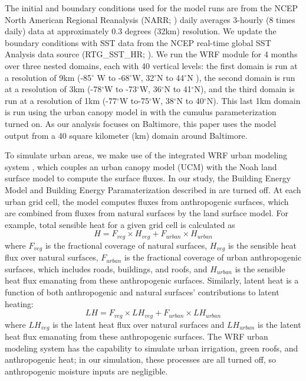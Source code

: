 \documentclass[draft,linenumbers]{agujournal}
\begin{document}
The initial and boundary conditions used for the model runs are from the NCEP North American Regional Reanalysis (NARR; \cite{mesinger2006north}) daily averages 3-hourly (8 times daily) data at approximately 0.3 degrees (32km) resolution. 
We update the boundary conditions with SST data from the NCEP real-time global SST Analysis data source (RTG{\_}SST{\_}HR; \cite{thiebaux2003new}). 
We run the WRF module for 4 months over three nested domains, each with 40 vertical levels: the first domain is run at a resolution of 9km (-85$^\circ$ W to -68$^\circ$W, 32$^\circ$N to 44$^\circ$N ), the second domain is run at a resolution of 3km (-78$^\circ$W to -73$^\circ$W, 36$^\circ$N to 41$^\circ$N), and the third domain is run at a resolution of 1km (-77$^\circ$W to-75$^\circ$W, 38$^\circ$N to 40$^\circ$N). This last 1km domain is run using the urban canopy model in \cite{chen2011integrated} with the cumulus parameterization turned on. 
As our analysis focuses on Baltimore, this paper uses the model output from a 40 square kilometer (km) domain around Baltimore.

To simulate urban areas, we make use of the integrated WRF urban modeling system \citep{chen2011integrated}, which couples an urban canopy model (UCM) with the Noah land surface model to compute the surface fluxes. In our study, the Building Energy Model and Building Energy Paramaterization described in \cite{chen2011integrated} are turned off. 
At each urban grid cell, the model computes fluxes from anthropogenic surfaces, which are combined from fluxes from natural surfaces by the land surface model. 
For example, total sensible heat for a given grid cell is calculated as \[ H = F_{veg} \times H_{veg} + F_{urban}\times H_{urban}\]
where $F_{veg}$ is the fractional coverage of natural surfaces, $H_{veg}$ is the sensible heat flux over natural surfaces, $F_{urban}$ is the fractional coverage of urban anthropogenic surfaces, which includes roads, buildings, and roofs, and $H_{urban}$ is the sensible heat flux emanating from these anthropogenic surfaces. Similarly, latent heat is a function of both anthropogenic and natural surfaces' contributions to latent heating: 
\[LH = F_{veg} \times LH_{veg} + F_{urban}\times LH_{urban}\]
where $LH_{veg}$ is the latent heat flux over natural surfaces and $LH_{urban}$ is the latent heat flux emanating from these anthropogenic surfaces.
The WRF urban modeling system has the capability to simulate urban irrigation, green roofs, and anthropogenic heat; in our simulation, these processes are all turned off, so anthropogenic moisture inputs are negligible.
\end{document}
